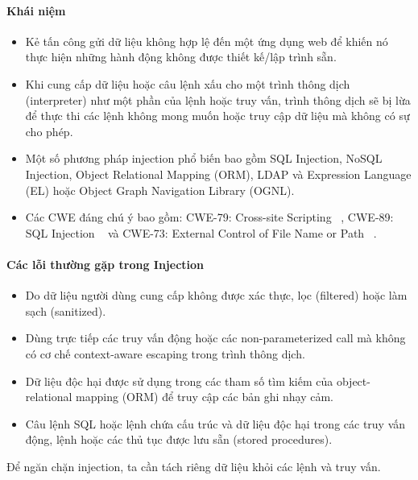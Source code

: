 \paragraph{Khái niệm ~\cite{chap2bib13}}

\begin{itemize}
    \item Kẻ tấn công gửi dữ liệu không hợp lệ đến một ứng dụng web để khiến nó thực hiện những hành động không được thiết kế/lập trình sẵn.
    \item Khi cung cấp dữ liệu hoặc câu lệnh xấu cho một trình thông dịch (interpreter) như một phần của lệnh hoặc truy vấn, trình thông dịch sẽ bị lừa để thực thi các lệnh không mong muốn hoặc truy cập dữ liệu mà không có sự cho phép.
    \item Một số phương pháp injection phổ biến bao gồm SQL Injection, NoSQL Injection, Object Relational Mapping (ORM), LDAP và Expression Language (EL) hoặc Object Graph Navigation Library (OGNL).
    \item Các CWE đáng chú ý bao gồm: CWE-79: Cross-site Scripting ~\cite{chap2bib14}, CWE-89: SQL Injection ~\cite{chap2bib15} và CWE-73: External Control of File Name or Path ~\cite{chap2bib16}.
\end{itemize}

\paragraph{Các lỗi thường gặp trong Injection}

\begin{itemize}
    \item Do dữ liệu người dùng cung cấp không được xác thực, lọc (filtered) hoặc làm sạch (sanitized).
    \item Dùng trực tiếp các truy vấn động hoặc các non-parameterized call mà không có cơ chế context-aware escaping trong trình thông dịch.
    \item Dữ liệu độc hại được sử dụng trong các tham số tìm kiếm của object-relational mapping (ORM) để truy cập các bản ghi nhạy cảm.
    \item Câu lệnh SQL hoặc lệnh chứa cấu trúc và dữ liệu độc hại trong các truy vấn động, lệnh hoặc các thủ tục được lưu sẵn (stored procedures).
\end{itemize}


\tab \tab Để ngăn chặn injection, ta cần tách riêng dữ liệu khỏi các lệnh và truy vấn.

